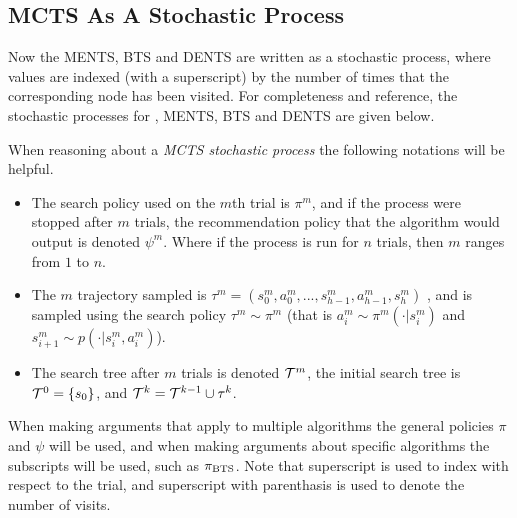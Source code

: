 





\subsection{MCTS As A Stochastic Process}
    Now the MENTS, BTS and DENTS are written as a stochastic process, where values are indexed (with a superscript) by the number of times that the corresponding node has been visited. For completeness and reference, the stochastic processes for , MENTS, BTS and DENTS are given below.
    



    When reasoning about a \textit{MCTS stochastic process} the following notations will be helpful.
    \begin{itemize}
        \item 
            The search policy used on the $m$th trial is $\pi^m$, and if the process were stopped after $m$ trials, the recommendation policy that the algorithm would output is denoted $\psi^m$. Where if the process is run for $n$ trials, then $m$ ranges from $1$ to $n$.
        \item 
            The $m$ trajectory sampled is $\tau^m=(s_0^m,a_0^m,...,s_{h-1}^m,a_{h-1}^m,s_{h}^m)$ , and is sampled using the search policy $\tau^m \sim \pi^m$ (that is $a^m_i \sim \pi^m(\cdot|s^m_i)$ and $s^m_{i+1} \sim p(\cdot | s^m_i, a^m_i)$). 
        \item 
            The search tree after $m$ trials is denoted $\mathcal{T}^m$, the initial search tree is $\mathcal{T}^0=\{s_0\}$, and $\mathcal{T}^k = \mathcal{T}^{k-1} \cup \tau^k$.
    \end{itemize}

    When making arguments that apply to multiple algorithms the general policies $\pi$ and $\psi$ will be used, and when making arguments about specific algorithms the subscripts will be used, such as ${\pi_{{\textnormal{BTS}}}}$. Note that superscript is used to index with respect to the trial, and superscript with parenthasis is used to denote the number of visits.

